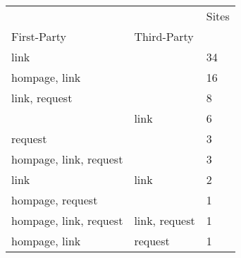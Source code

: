 \begin{tabular}{lll}
 &  & Sites \\
First-Party & Third-Party &  \\
link &  & 34 \\
hompage, link &  & 16 \\
link, request &  & 8 \\
 & link & 6 \\
request &  & 3 \\
hompage, link, request &  & 3 \\
link & link & 2 \\
hompage, request &  & 1 \\
hompage, link, request & link, request & 1 \\
hompage, link & request & 1 \\
\end{tabular}

